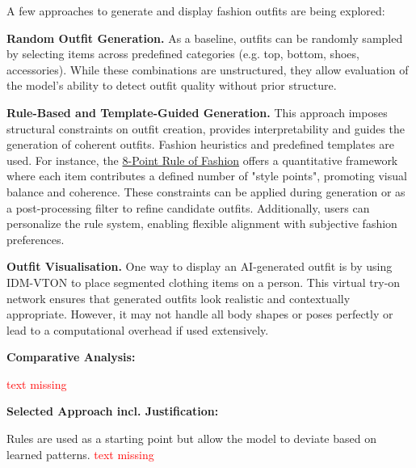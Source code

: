 A few approaches to generate and display fashion outfits are being explored:

\vspace{0.5cm}

\textbf{Random Outfit Generation.}
As a baseline, outfits can be randomly sampled by selecting items across predefined categories (e.g. top, bottom, shoes, accessories). While these combinations are unstructured, they allow evaluation of the model's ability to detect outfit quality without prior structure.

\vspace{0.5cm}

\textbf{Rule-Based and Template-Guided Generation.}
This approach imposes structural constraints on outfit creation, provides interpretability and guides the generation of coherent outfits. Fashion heuristics and predefined templates are used. For instance, the \href{https://medium.com/@snc5440/the-8-point-rule-of-fashion-31180d957925}{8-Point Rule of Fashion} offers a quantitative framework where each item contributes a defined number of "style points", promoting visual balance and coherence. These constraints can be applied during generation or as a post-processing filter to refine candidate outfits. Additionally, users can personalize the rule system, enabling flexible alignment with subjective fashion preferences.

\vspace{0.5cm}

\textbf{Outfit Visualisation.}
One way to display an \acs{AI}-generated outfit is by using \acs{IDM-VTON} to place segmented clothing items on a person. This virtual try-on network ensures that generated outfits look realistic and contextually appropriate. However, it may not handle all body shapes or poses perfectly or lead to a computational overhead if used extensively.

\vspace{0.5cm}

\textbf{Comparative Analysis:}

\vspace{0.5cm}

\textcolor{red}{text missing}

\vspace{0.5cm}

\textbf{Selected Approach incl. Justification:}

\vspace{0.5cm}

Rules are used as a starting point but allow the model to deviate based on learned patterns. \textcolor{red}{text missing}

